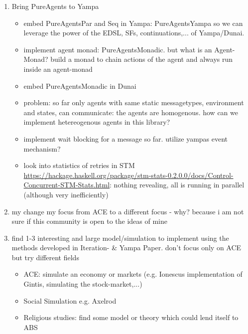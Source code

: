 \begin{enumerate}
\item Bring PureAgents to Yampa
	\begin{itemize}
		\item embed PureAgentsPar and Seq in Yampa: PureAgentsYampa so we can leverage the power of the EDSL, SFs, continuations,... of Yampa/Dunai.
		\item implement agent monad: PureAgentsMonadic. but what is an Agent-Monad? build a monad to chain actions of the agent and always run inside an agent-monad
		\item embed PureAgentsMonadic in Dunai
		\item problem: so far only agents with same static messagetypes, environment and states, can communicate: the agents are homogenous. how can we implement hetereogenous agents in this library?
		\item implement wait blocking for a message so far. utilize yampas event mechanism?
		\item look into statistics of retries in STM \url{https://hackage.haskell.org/package/stm-stats-0.2.0.0/docs/Control-Concurrent-STM-Stats.html}: nothing revealing, all is running in parallel (although very inefficiently)
	\end{itemize}
	
\item my change my focus from ACE to a different focus - why? because i am not sure if this community is open to the ideas of mine

\item find 1-3 interesting and large model/simulation to implement using the methods developed in Iteration- \& Yampa Paper. don't focus only on ACE but try different fields
	\begin{itemize}
		\item ACE: simulate an economy or markets (e.g. Ionescus implementation of Gintis, simulating the stock-market,...)
		\item Social Simulation e.g. Axelrod
		\item Religious studies: find some model or theory which could lend itself to ABS
	\end{itemize}

\end{enumerate} 

